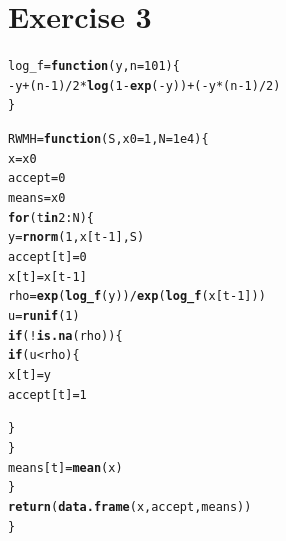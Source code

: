 \documentclass{article}\usepackage[]{graphicx}\usepackage[]{color}
\makeatletter
\newcommand{\hlnum}[1]{\textcolor[rgb]{0.686,0.059,0.569}{#1}}%
\newcommand{\hlopt}[1]{\textcolor[rgb]{0,0,0}{#1}}%
\newcommand{\hlstd}[1]{\textcolor[rgb]{0.345,0.345,0.345}{#1}}%
\newcommand{\hlkwa}[1]{\textcolor[rgb]{0.161,0.373,0.58}{\textbf{#1}}}%
\newcommand{\hlkwb}[1]{\textcolor[rgb]{0.69,0.353,0.396}{#1}}%
\newcommand{\hlkwc}[1]{\textcolor[rgb]{0.333,0.667,0.333}{#1}}%
\newcommand{\hlkwd}[1]{\textcolor[rgb]{0.737,0.353,0.396}{\textbf{#1}}}%
\newenvironment{kframe}{%
 \def\at@end@of@kframe{}%
 \ifinner\ifhmode%
  \def\at@end@of@kframe{\end{minipage}}%
  \begin{minipage}{\columnwidth}%
 \fi\fi%
 \def\FrameCommand##1{\hskip\@totalleftmargin \hskip-\fboxsep
 \colorbox{shadecolor}{##1}\hskip-\fboxsep
     \hskip-\linewidth \hskip-\@totalleftmargin \hskip\columnwidth}%
 \MakeFramed {\advance\hsize-\width
   \@totalleftmargin\z@ \linewidth\hsize
   \@setminipage}}%
 {\par\unskip\endMakeFramed%
 \at@end@of@kframe}
\newenvironment{knitrout}{}{} %
\makeatother
\begin{document}
\section*{Exercise 3}
\begin{knitrout}
\color{fgcolor}\begin{kframe}
\begin{alltt}
\hlstd{log_f} \hlkwb{=} \hlkwa{function}\hlstd{(}\hlkwc{y}\hlstd{,}\hlkwc{n}\hlstd{=}\hlnum{101}\hlstd{)\{}
  \hlopt{-}\hlstd{y}\hlopt{+}\hlstd{(n}\hlopt{-}\hlnum{1}\hlstd{)}\hlopt{/}\hlnum{2}\hlopt{*}\hlkwd{log}\hlstd{(}\hlnum{1}\hlopt{-}\hlkwd{exp}\hlstd{(}\hlopt{-}\hlstd{y))}\hlopt{+}\hlstd{(}\hlopt{-}\hlstd{y}\hlopt{*}\hlstd{(n}\hlopt{-}\hlnum{1}\hlstd{)}\hlopt{/}\hlnum{2}\hlstd{)}
\hlstd{\}}

\hlstd{RWMH} \hlkwb{=} \hlkwa{function}\hlstd{(}\hlkwc{S}\hlstd{,} \hlkwc{x0}\hlstd{=}\hlnum{1}\hlstd{,} \hlkwc{N} \hlstd{=} \hlnum{1e4}\hlstd{)\{}
  \hlstd{x} \hlkwb{=} \hlstd{x0}
  \hlstd{accept} \hlkwb{=} \hlnum{0}
  \hlstd{means} \hlkwb{=} \hlstd{x0}
  \hlkwa{for}\hlstd{(t} \hlkwa{in} \hlnum{2}\hlopt{:}\hlstd{N)\{}
    \hlstd{y} \hlkwb{=} \hlkwd{rnorm}\hlstd{(}\hlnum{1}\hlstd{, x[t}\hlopt{-}\hlnum{1}\hlstd{], S)}
    \hlstd{accept[t]} \hlkwb{=} \hlnum{0}
    \hlstd{x[t]} \hlkwb{=}\hlstd{x[t}\hlopt{-}\hlnum{1}\hlstd{]}
    \hlstd{rho} \hlkwb{=} \hlkwd{exp}\hlstd{(}\hlkwd{log_f}\hlstd{(y))}\hlopt{/}\hlkwd{exp}\hlstd{(}\hlkwd{log_f}\hlstd{(x[t}\hlopt{-}\hlnum{1}\hlstd{]))}
    \hlstd{u} \hlkwb{=} \hlkwd{runif}\hlstd{(}\hlnum{1}\hlstd{)}
      \hlkwa{if}\hlstd{(}\hlopt{!}\hlkwd{is.na}\hlstd{(rho))\{}
        \hlkwa{if}\hlstd{(u}\hlopt{<}\hlstd{rho)\{}
          \hlstd{x[t]} \hlkwb{=} \hlstd{y}
          \hlstd{accept[t]} \hlkwb{=} \hlnum{1}

          \hlstd{\}}
      \hlstd{\}}
    \hlstd{means[t]} \hlkwb{=} \hlkwd{mean}\hlstd{(x)}
  \hlstd{\}}
  \hlkwd{return}\hlstd{(}\hlkwd{data.frame}\hlstd{(x, accept, means))}
  \hlstd{\}}
\end{alltt}
\end{kframe}
\end{knitrout}
\end{document}

